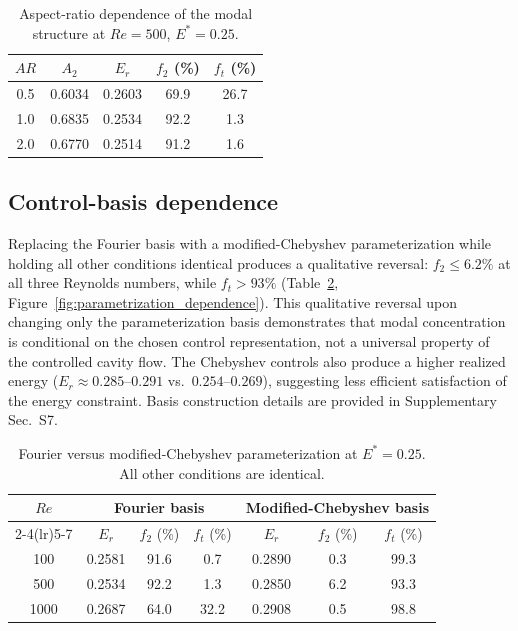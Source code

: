 \documentclass[a4paper,11pt]{article}
\begin{document}
\begin{table}[t]
\centering
\caption{Aspect-ratio dependence of the modal structure at \(Re=500\), \(E^*=0.25\).}
\label{tab:aspect_ratio}
\small
\begin{tabular}{ccccc}
\toprule
\(AR\) & \(A_2\) & \(E_r\) & \(f_2\) (\%) & \(f_t\) (\%)\\
\midrule
0.5 & 0.6034 & 0.2603 & 69.9 & 26.7\\
1.0 & 0.6835 & 0.2534 & 92.2 & 1.3\\
2.0 & 0.6770 & 0.2514 & 91.2 & 1.6\\
\bottomrule
\end{tabular}
\end{table}

\subsection{Control-basis dependence}

Replacing the Fourier basis with a modified-Chebyshev parameterization while holding
all other conditions identical produces a qualitative reversal: \(f_2\le6.2\%\)
at all three Reynolds numbers, while \(f_t>93\%\)
(Table~\ref{tab:basis_comparison}, Figure~\ref{fig:parametrization_dependence}).
This qualitative reversal upon changing only the parameterization basis demonstrates
that modal concentration is conditional on the chosen control representation,
not a universal property of the controlled cavity flow. The Chebyshev controls
also produce a higher realized energy (\(E_r\approx0.285\)--\(0.291\) vs.\
\(0.254\)--\(0.269\)), suggesting less efficient satisfaction of the energy constraint.
Basis construction details are provided in Supplementary Sec.~S7.

\begin{table}[t]
\centering
\caption{Fourier versus modified-Chebyshev parameterization at \(E^*=0.25\).
All other conditions are identical.}
\label{tab:basis_comparison}
\small
\begin{tabular}{ccccccc}
\toprule
\(Re\) & \multicolumn{3}{c}{Fourier basis} & \multicolumn{3}{c}{Modified-Chebyshev basis}\\
\cmidrule(lr){2-4}\cmidrule(lr){5-7}
& \(E_r\) & \(f_2\) (\%) & \(f_t\) (\%) & \(E_r\) & \(f_2\) (\%) & \(f_t\) (\%)\\
\midrule
100  & 0.2581 & 91.6 & 0.7  & 0.2890 & 0.3 & 99.3\\
500  & 0.2534 & 92.2 & 1.3  & 0.2850 & 6.2 & 93.3\\
1000 & 0.2687 & 64.0 & 32.2 & 0.2908 & 0.5 & 98.8\\
\bottomrule
\end{tabular}
\end{table}
\end{document}
